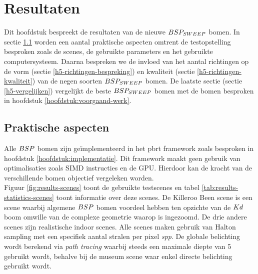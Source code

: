 \chapter{Resultaten}
\label{hoofdstuk:resultaten}
Dit hoofdstuk bespreekt de resultaten van de nieuwe $BSP_{SWEEP}$ bomen.
In sectie \ref{h5:praktische-aspecten} worden een aantal praktische aspecten omtrent de testopstelling besproken zoals de scenes, de gebruikte parameters en het gebruikte computersysteem.
Daarna bespreken we de invloed van het aantal richtingen op de vorm (sectie \ref{h5-richtingen-bespreking}) en kwaliteit (sectie \ref{h5-richtingen-kwaliteit}) van de negen soorten $BSP_{SWEEP}$ bomen.
De laatste sectie (sectie \ref{h5-vergelijken}) vergelijkt de beste $BSP_{SWEEP}$ bomen met de bomen besproken in hoofdstuk \ref{hoofdstuk:voorgaand-werk}.

\section{Praktische aspecten}
\label{h5:praktische-aspecten}
Alle $BSP$ bomen zijn geïmplementeerd in het pbrt framework zoals besproken in hoofdstuk \ref{hoofdstuk:implementatie}. 
Dit framework maakt geen gebruik van optimalisaties zoals SIMD instructies en de GPU. 
Hierdoor kan de kracht van de verschillende bomen objectief vergeleken worden.\\

Figuur \ref{fig:results-scenes} toont de gebruikte testscenes en tabel \ref{tab:results-statistics-scenes} toont informatie over deze scenes.
De Killeroo Been scene is een scene waarbij algemene $BSP$ bomen voordeel hebben ten opzichte van de $Kd$ boom omwille van de complexe geometrie waarop is ingezoomd.
De drie andere scenes zijn realistische indoor scenes.
Alle scenes maken gebruik van Halton sampling met een specifiek aantal stralen per pixel \textit{spp}.
De globale belichting wordt berekend via \textit{path tracing} waarbij steeds een maximale diepte van 5 gebruikt wordt, behalve bij de museum scene waar enkel directe belichting gebruikt wordt.\\

